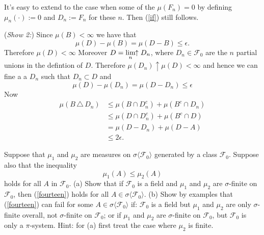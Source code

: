 \begin{exerciseproof}
It's easy to extend to the case when some of the $\mu(F_n)=0$ by defining $\mu_n (\cdot):=0$ and $D_n:=F_n$ for these $n$. Then (\ref{if}) still follows.

\textbullet({\sl Show 2:})
Since $\mu(B)<\infty$ we have that
\begin{equation}
 \mu(D)-\mu(B)=\mu(D-B)\leq \epsilon.
\end{equation}
Therefore $\mu(D)<\infty$
Moreover $D=\displaystyle\lim_{n}\!\!\uparrow D_n$, where $D_n\in \mathcal F_0$ are the $n$ partial unions in the defintion of $D$.
Therefore $\mu(D_n)\uparrow \mu(D)<\infty$ and hence we can fine a
 a $D_n$ such that $D_n\subset D$ and
\begin{equation}
\mu(D) - \mu(D_n)=\mu(D - D_n)\leq \epsilon
\end{equation}
Now
\begin{align*}
\mu(B\,\triangle\, D_n)
&\leq \mu(B\cap D_n^c) + \mu(B^c \cap D_n)\\
&\leq \mu(D \cap D_n^c) + \mu(B^c \cap D)\\
&= \mu(D - D_n) + \mu(D - A)\\
&\leq 2\epsilon.
\end{align*}
\end{exerciseproof}






\begin{exercise}
Suppose that $\mu_1$ and $\mu_2$ are measures on  $\sigma\langle \mathcal F_0\rangle$ generated by a class $\mathcal F_0$. Suppose also that the inequality
\begin{equation}
\label{fourteen}
\mu_1(A)\leq \mu_2(A)
\end{equation}
holds for all $A$ in $\mathcal F_0$. (a) Show that if $\mathcal F_0$ is a field and $\mu_1$ and $\mu_2$ are $\sigma$-finite on $\mathcal F_0$, then (\ref{fourteen}) holds for all $A\in\sigma\langle \mathcal F_0\rangle$. (b) Show by examples that (\ref{fourteen}) can fail for some $A\in\sigma\langle \mathcal F_0\rangle$ if: $\mathcal F_0$ is a field but $\mu_1$ and $\mu_2$ are only $\sigma$-finite  overall, not $\sigma$-finite on $\mathcal F_0$; or if $\mu_1$ and $\mu_2$ are $\sigma$-finite on $\mathcal F_0$, but $\mathcal F_0$ is only a $\pi$-system. Hint: for (a) first treat the case where $\mu_2$ is finite.
\end{exercise}



